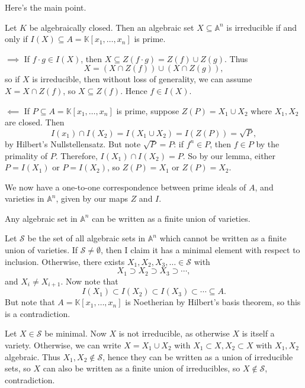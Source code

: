 \documentclass[12pt]{article}
\begin{document}
Here's the main point.

\begin{proposition}
	Let $K$ be algebraically closed. Then an algebraic set $X \subseteq \mathbb{A}^n$ is irreducible if and only if $I(X) \subseteq A = \mathbb{K}[x_1, \ldots, x_n]$ is prime.
\end{proposition}


\begin{proofbox}
	

	$\implies$ If $f \cdot g \in I(X)$, then $X \subseteq Z(f \cdot g) = Z(f) \cup Z(g)$. Thus
	\[
	X = (X \cap Z(f)) \cup (X \cap Z(g)),
	\]
	so if $X$ is irreducible, then without loss of generality, we can assume $X = X \cap Z(f)$, so $X \subseteq Z(f)$. Hence $f \in I(X)$.

	$\impliedby$ If $P \subseteq A = \mathbb{K}[x_1, \ldots, x_n]$ is prime, suppose $Z(P) = X_1 \cup X_2$ where $X_1, X_2$ are closed. Then
	\[
	I(x_1) \cap I(X_2) = I(X_1 \cup X_2) = I(Z(P)) = \sqrt P,
	\]
	by Hilbert's Nullstellensatz. But note $\sqrt P = P$: if $f^n \in P$, then $f \in P$ by the primality of $P$. Therefore, $I(X_1) \cap I(X_2) = P$. So by our lemma, either $P = I(X_1)$ or $P = I(X_2)$, so $Z(P) = X_1$ or $Z(P) = X_2$.
\end{proofbox}

We now have a one-to-one correspondence between prime ideals of $A$, and varieties in $\mathbb{A}^n$, given by our maps $Z$ and $I$.

\begin{proposition}
	Any algebraic set in $\mathbb{A}^n$ can be written as a finite union of varieties.
\end{proposition}

\begin{proofbox}
	Let $\mathcal{S}$ be the set of all algebraic sets in $\mathbb{A}^n$ which cannot be written as a finite union of varieties. If $\mathcal{S} \neq \emptyset$, then I claim it has a minimal element with respect to inclusion. Otherwise, there exists $X_1, X_2, X_3, \ldots \in \mathcal{S}$ with
	\[
	X_1 \supset X_2 \supset X_3 \supset \cdots,
	\]
	and $X_i \neq X_{i+1}$. Now note that
	\[
	I(X_1) \subset I(X_2) \subset I(X_3) \subset \cdots \subseteq A.
	\]
	But note that $A = \mathbb{K}[x_1, \ldots, x_n]$ is Noetherian by Hilbert's basis theorem, so this is a contradiction.

	Let $X \in \mathcal{S}$ be minimal. Now $X$ is not irreducible, as otherwise $X$ is itself a variety. Otherwise, we can write $X = X_1 \cup X_2$ with $X_1 \subset X, X_2 \subset X$ with $X_1, X_2$ algebraic. Thus $X_1, X_2 \not \in \mathcal{S}$, hence they can be written as a union of irreducible sets, so $X$ can also be written as a finite union of irreducibles, so $X \not \in \mathcal{S}$, contradiction.
\end{proofbox}
\end{document}
